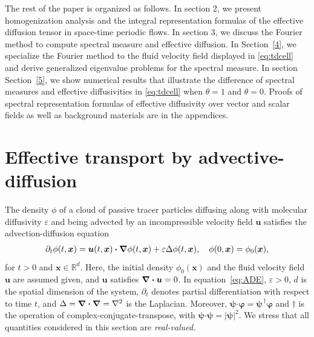 \documentclass[leqno,onefignum,onetabnum]{siamltex1213}
\newcommand{\secref}[1]{Section~\ref{#1}}
\newcommand\bnabla{\mbox{\boldmath${\nabla}$}}
\providecommand\bcdot{\boldsymbol{\cdot}}
\newcommand{\vecx}{\boldsymbol{x}}
\newcommand{\vecu}{\boldsymbol{u}}
\newcommand{\vecpsi}{\boldsymbol{\psi}}
\newcommand{\vecvarphi}{\boldsymbol{\varphi}}
\begin{document}
The rest of the paper is organized as follows. In section 2, we present 
homogenization analysis and the integral representation formulas of 
the effective diffusion tensor in space-time periodic flows. In section 3, 
we discuss the Fourier method to compute spectral measure and 
effective diffusion. In \secref{4}, we specialize the Fourier method to
the fluid velocity field displayed in \eqref{eq:tdcell} and derive
generalized eigenvalue problems for the spectral measure. In section
\secref{5}, we  
show numerical results that illustrate the difference of spectral measures and 
effective diffusivities in \eqref{eq:tdcell} when $\theta =1$ and
$\theta=0$. Proofs of spectral representation formulas of effective
diffusivity over vector and scalar fields as well as background
materials are in the appendices. 

\section{Effective transport by
  advective-diffusion} \label{sec:Eff_Trans}    
%
The density $\phi$ of a cloud of passive tracer particles diffusing along
with molecular diffusivity $\varepsilon$ and being advected by an incompressible
velocity field $\vecu$ satisfies the advection-diffusion equation
%
\begin{align}\label{eq:ADE}
  \partial_t\phi(t,\vecx)
    =\vecu (t,\vecx)\bcdot\bnabla \phi(t,\vecx)+\varepsilon\Delta \phi(t,\vecx),
  \quad
  \phi(0,\vecx)=\phi_0(\vecx),  
\end{align}
%
for $t>0$ and $\vecx\in\mathbb{R}^d$.
Here, the initial density $\phi_0(\vecx)$ and the fluid velocity field
$\vecu$ are assumed given, and $\vecu$ satisfies $\bnabla\bcdot\vecu=0$.
In equation~\eqref{eq:ADE}, $\varepsilon>0$, $d$ is the spatial dimension of the
system, $\partial_t$ denotes partial differentiation with respect to time
$t$, and $\Delta=\bnabla\bcdot\bnabla =\nabla^2$ is the Laplacian. Moreover, 
$\vecpsi\bcdot\vecvarphi=\vecpsi^{\,\dagger}\vecvarphi$ and $\dagger$ is the
operation of complex-conjugate-transpose, with
$\vecpsi\bcdot\vecpsi=|\vecpsi|^2$. We stress that all quantities 
considered in this section are \emph{real-valued}. 
\end{document}
